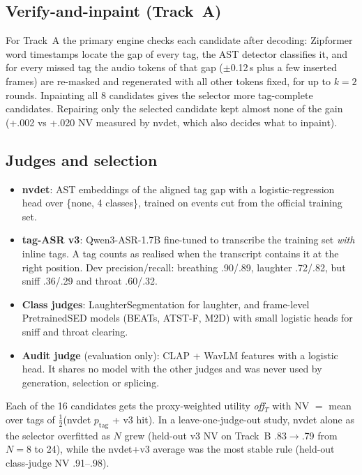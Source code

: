 \documentclass[11pt]{article}
\begin{document}
\subsection{Verify-and-inpaint (Track~A)}
For Track~A the primary engine checks each candidate after decoding: Zipformer word timestamps locate the gap of every
tag, the AST detector classifies it, and for every missed tag the audio tokens of that gap ($\pm$0.12\,s plus a few
inserted frames) are re-masked and regenerated with all other tokens fixed, for up to $k{=}2$ rounds. Inpainting all 8
candidates gives the selector more tag-complete candidates. Repairing only the selected candidate kept almost none of
the gain (+.002 vs +.020 NV measured by nvdet, which also decides what to inpaint).

\subsection{Judges and selection}
\label{sec:judges}
\begin{itemize}\itemsep0pt
\item \textbf{nvdet}: AST \citep{gong2021ast} embeddings of the aligned tag gap with a logistic-regression head over
\{none, 4 classes\}, trained on events cut from the official training set.
\item \textbf{tag-ASR v3}: Qwen3-ASR-1.7B \citep{qwen3asr} fine-tuned to transcribe the training set \emph{with} inline
tags. A tag counts as realised when the transcript contains it at the right position. Dev precision/recall: breathing
.90/.89, laughter .72/.82, but sniff .36/.29 and throat .60/.32.
\item \textbf{Class judges}: LaughterSegmentation \citep{laughterseg} for laughter, and frame-level PretrainedSED models
\citep{schmid2024psed} (BEATs, ATST-F, M2D) with small logistic heads for sniff and throat clearing.
\item \textbf{Audit judge} (evaluation only): CLAP \citep{wu2023clap} + WavLM \citep{chen2022wavlm} features with a
logistic head. It shares no model with the other judges and was never used by generation, selection or splicing.
\end{itemize}
Each of the 16 candidates gets the proxy-weighted utility \textit{off}$_T$ with NV $=$ mean over tags of
$\tfrac12$(nvdet $p_{\mathrm{tag}}$ + v3 hit). In a leave-one-judge-out study, nvdet alone as the selector overfitted as
$N$ grew (held-out v3 NV on Track~B .83$\rightarrow$.79 from $N{=}8$ to 24), while the nvdet+v3 average was the most
stable rule (held-out class-judge NV .91--.98).
\end{document}
